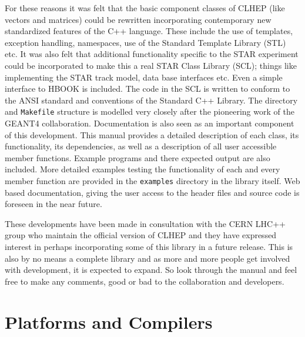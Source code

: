 \documentclass[twoside]{article}
\newcommand{\comp}[1]{\texttt{#1}}%
\begin{document}
For these reasons it was felt that the basic component classes of CLHEP
(like vectors and matrices) could be rewritten incorporating contemporary
new standardized features of the C++
language.  These include the use of templates, exception handling, 
namespaces, use of the Standard Template Library (STL)
 etc.  It was also felt that additional functionality specific
to the STAR experiment could be incorporated to make this a real
STAR Class Library (SCL); things like implementing the STAR track model,
data base interfaces etc.  Even a simple interface to HBOOK is included.
The code in the SCL is written to conform to the ANSI standard
and conventions of the Standard C++ Library.  The directory 
and \texttt{Makefile} structure is modelled very closely after the
pioneering work of the GEANT4 collaboration.  Documentation is also seen as
an important component of this development.  This manual provides a detailed
description of each class, its functionality, its dependencies, as well as
a description of all user accessible member functions.  Example programs
and there expected output are also included.  More detailed examples
testing the functionality of each and every member function are provided in
the \comp{examples} directory in the library itself.  Web based documentation,
giving the user access to the header files and source code is foreseen
in the near future.

These developments have been made in consultation with the CERN LHC++
group who maintain the official version of CLHEP and they have
expressed interest in perhaps incorporating some of this library
in a future release.  This is also by no means a complete library and as
more and more people get involved with development, it is expected to
expand.  So look through the manual and feel free to
make any comments, good or bad to the collaboration and developers.



\section{Platforms and Compilers}  
\label{platformsAndCompilers}
\end{document}
